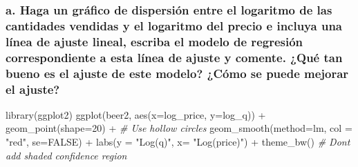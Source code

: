 \documentclass[
]{article}
\newenvironment{Shaded}{\begin{snugshade}}{\end{snugshade}}
\newcommand{\AttributeTok}[1]{\textcolor[rgb]{0.77,0.63,0.00}{#1}}
\newcommand{\CommentTok}[1]{\textcolor[rgb]{0.56,0.35,0.01}{\textit{#1}}}
\newcommand{\ConstantTok}[1]{\textcolor[rgb]{0.00,0.00,0.00}{#1}}
\newcommand{\DecValTok}[1]{\textcolor[rgb]{0.00,0.00,0.81}{#1}}
\newcommand{\FunctionTok}[1]{\textcolor[rgb]{0.00,0.00,0.00}{#1}}
\newcommand{\NormalTok}[1]{#1}
\newcommand{\OtherTok}[1]{\textcolor[rgb]{0.56,0.35,0.01}{#1}}
\newcommand{\SpecialCharTok}[1]{\textcolor[rgb]{0.00,0.00,0.00}{#1}}
\newcommand{\StringTok}[1]{\textcolor[rgb]{0.31,0.60,0.02}{#1}}
\begin{document}
\hypertarget{a.-haga-un-gruxe1fico-de-dispersiuxf3n-entre-el-logaritmo-de-las-cantidades-vendidas-y-el-logaritmo-del-precio-e-incluya-una-luxednea-de-ajuste-lineal-escriba-el-modelo-de-regresiuxf3n-correspondiente-a-esta-luxednea-de-ajuste-y-comente.-quuxe9-tan-bueno-es-el-ajuste-de-este-modelo-cuxf3mo-se-puede-mejorar-el-ajuste}{%
\subsubsection{a. Haga un gráfico de dispersión entre el logaritmo de
las cantidades vendidas y el logaritmo del precio e incluya una línea de
ajuste lineal, escriba el modelo de regresión correspondiente a esta
línea de ajuste y comente. ¿Qué tan bueno es el ajuste de este modelo?
¿Cómo se puede mejorar el
ajuste?}\label{a.-haga-un-gruxe1fico-de-dispersiuxf3n-entre-el-logaritmo-de-las-cantidades-vendidas-y-el-logaritmo-del-precio-e-incluya-una-luxednea-de-ajuste-lineal-escriba-el-modelo-de-regresiuxf3n-correspondiente-a-esta-luxednea-de-ajuste-y-comente.-quuxe9-tan-bueno-es-el-ajuste-de-este-modelo-cuxf3mo-se-puede-mejorar-el-ajuste}}

\begin{Shaded}
\end{Shaded}

\begin{Shaded}
\begin{Highlighting}[]
\FunctionTok{library}\NormalTok{(ggplot2)}
\FunctionTok{ggplot}\NormalTok{(beer2, }\FunctionTok{aes}\NormalTok{(}\AttributeTok{x=}\NormalTok{log\_price, }\AttributeTok{y=}\NormalTok{log\_q)) }\SpecialCharTok{+}
    \FunctionTok{geom\_point}\NormalTok{(}\AttributeTok{shape=}\DecValTok{20}\NormalTok{) }\SpecialCharTok{+}    \CommentTok{\# Use hollow circles}
    \FunctionTok{geom\_smooth}\NormalTok{(}\AttributeTok{method=}\NormalTok{lm, }\AttributeTok{col =} \StringTok{"red"}\NormalTok{, }\AttributeTok{se=}\ConstantTok{FALSE}\NormalTok{) }\SpecialCharTok{+} \FunctionTok{labs}\NormalTok{(}\AttributeTok{y =} \StringTok{"Log(q)"}\NormalTok{, }\AttributeTok{x=} \StringTok{"Log(price)"}\NormalTok{) }\SpecialCharTok{+} \FunctionTok{theme\_bw}\NormalTok{()   }\CommentTok{\# Don\textquotesingle{}t add shaded confidence region}
\end{Highlighting}
\end{Shaded}
\end{document}
